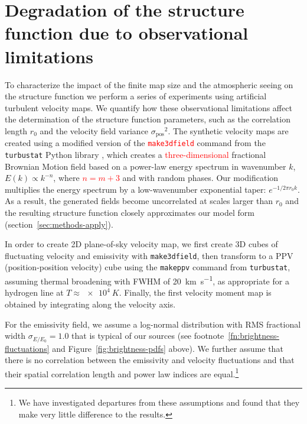\documentclass[fleqn,usenatbib, useAMS, a4paper]{mnras}
\newcommand\pos{\ensuremath{_{\mathrm{pos}}}}
\newcommand\shortsig[1]{\ensuremath{\sigma_{#1/#1_0}}}
\begin{document}





\appendix
{}
\section{\color{red}Degradation of the structure function due to observational limitations}
\label{sec:degr-struct-funct}

To characterize the impact of the finite map size
and the atmospheric seeing on the structure function we perform a series of experiments using artificial turbulent velocity maps.
We quantify how these observational limitations affect the determination of
the structure function parameters, such as
the correlation length \(r_0\) and the velocity field variance \(\sigma\pos^2\). 
The synthetic velocity maps are created using a modified version of the \textcolor{red}{\texttt{make\textunderscore{}3dfield}} command from the \texttt{turbustat} Python library \citep{Koch2019AJ....158....1K},
which creates a \textcolor{red}{three-dimensional} fractional Brownian Motion field
\citep{Miville-Deschenes:2003a}
based on a power-law energy spectrum in wavenumber \(k\), \(E(k) \propto k^{-n}\),
where \textcolor{red}{\(n = m + 3\)} and with random phases. 
Our modification multiplies the energy spectrum by a
low-wavenumber exponential taper:
\(e^{-1 / 2 \pi r_0 k}\).
As a result, the generated fields become uncorrelated at scales larger than \(r_0\)
and the resulting structure function closely approximates our model form
(section~\ref{sec:methods-apply}).

{\color{red}%
  In order to create 2D plane-of-sky velocity map, we first
  create 3D cubes of fluctuating velocity and emissivity
  with \texttt{make\textunderscore{}3dfield},
  then transform to a PPV (position-position velocity) cube
  using the \texttt{make\textunderscore{}ppv} command from \texttt{turbustat},
  assuming thermal broadening with FWHM of \SI{20}{\kilo\meter\per\second},
  as appropriate for a hydrogen line at \(T \approx \SI{e4}{K}\).
  Finally, the first velocity moment map is obtained
  by integrating along the velocity axis.

  For the emissivity field, we assume a log-normal distribution
  with RMS fractional width
  \(\shortsig{E} = 1.0\) that is typical of our sources
  (see footnote~\ref{fn:brightness-fluctuations} and Figure~\ref{fig:brightness-pdfs} above).
  We further assume that there is no correlation between the emissivity
  and velocity fluctuations and that their spatial correlation length
  and power law indices are equal.\footnote{%
    We have investigated departures from these assumptions and found that they
    make very little difference to the results.
  }
}
\end{document}
